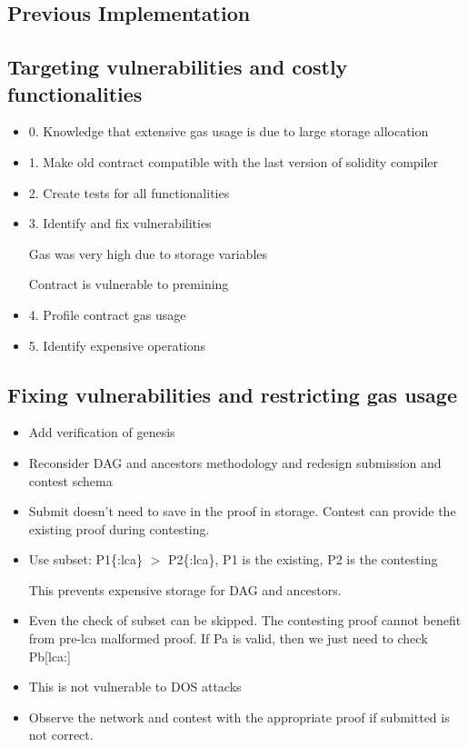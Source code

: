 \documentclass{article}
\begin{document}
  \subsection{Previous Implementation}

  \subsection{Targeting vulnerabilities and costly functionalities}

  \begin{itemize}
  \item
    0. Knowledge that extensive gas usage is due to large storage
    allocation
  \item
    1. Make old contract compatible with the last version of solidity
    compiler
  \item
    2. Create tests for all functionalities
  \item
    3. Identify and fix vulnerabilities

    Gas was very high due to storage variables

    Contract is vulnerable to premining
  \item
    4. Profile contract gas usage
  \item
    5. Identify expensive operations
  \end{itemize}

  \subsection{Fixing vulnerabilities and restricting gas usage}

  \begin{itemize}

  \item
    Add verification of genesis
  \item
    Reconsider DAG and ancestors methodology and redesign submission and
    contest schema
  \item
    Submit doesn't need to save in the proof in storage. Contest can
    provide the existing proof during contesting.

  \item
    Use subset: P1\{:lca\} $>$ P2\{:lca\}, P1 is the existing, P2 is the
    contesting

    This prevents expensive storage for DAG and ancestors.

  \item
    Even the check of subset can be skipped. The contesting proof cannot
    benefit from pre-lca malformed proof. If Pa is valid, then we just
    need to check Pb[lca:]

  \item
    This is not vulnerable to DOS attacks

  \item
    Observe the network and contest with the appropriate proof if
    submitted is not correct.

  \end{itemize}
\end{document}
